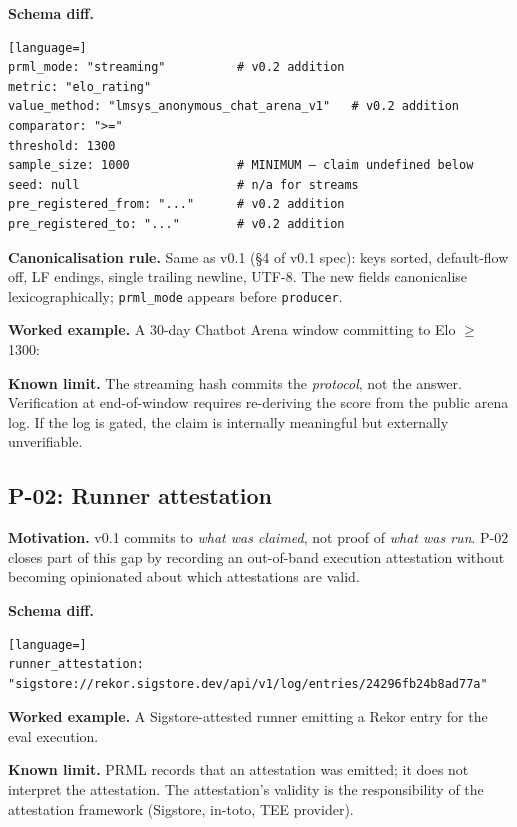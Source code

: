 \documentclass[11pt, a4paper]{article}
\begin{document}
\textbf{Schema diff.}

\begin{lstlisting}[language=]
prml_mode: "streaming"          # v0.2 addition
metric: "elo_rating"
value_method: "lmsys_anonymous_chat_arena_v1"   # v0.2 addition
comparator: ">="
threshold: 1300
sample_size: 1000               # MINIMUM — claim undefined below
seed: null                      # n/a for streams
pre_registered_from: "..."      # v0.2 addition
pre_registered_to: "..."        # v0.2 addition
\end{lstlisting}

\textbf{Canonicalisation rule.} Same as v0.1 (§4 of v0.1 spec): keys sorted, default-flow off, LF endings, single trailing newline, UTF-8. The new fields canonicalise lexicographically; \texttt{prml\_mode} appears before \texttt{producer}.

\textbf{Worked example.} A 30-day Chatbot Arena window committing to Elo $\geq$ 1300:


\textbf{Known limit.} The streaming hash commits the \emph{protocol}, not the answer. Verification at end-of-window requires re-deriving the score from the public arena log. If the log is gated, the claim is internally meaningful but externally unverifiable.

\subsection{P-02: Runner attestation}
\label{sec:p02}

\textbf{Motivation.} v0.1 commits to \emph{what was claimed}, not proof of \emph{what was run}. P-02 closes part of this gap by recording an out-of-band execution attestation without becoming opinionated about which attestations are valid.

\textbf{Schema diff.}

\begin{lstlisting}[language=]
runner_attestation: "sigstore://rekor.sigstore.dev/api/v1/log/entries/24296fb24b8ad77a"
\end{lstlisting}

\textbf{Worked example.} A Sigstore-attested runner emitting a Rekor entry for the eval execution.


\textbf{Known limit.} PRML records that an attestation was emitted; it does not interpret the attestation. The attestation's validity is the responsibility of the attestation framework (Sigstore, in-toto, TEE provider).
\end{document}
